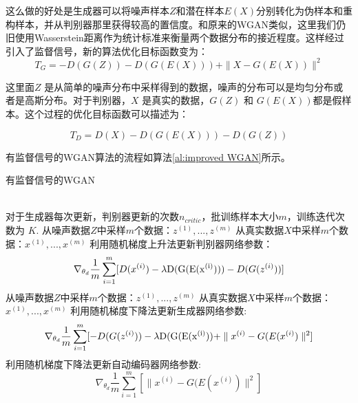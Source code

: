 这么做的好处是生成器可以将噪声样本$Z$和潜在样本$E(X)$分别转化为伪样本和重构样本，并从判别器那里获得较高的置信度。和原来的WGAN类似，这里我们仍旧使用Wasserstein距离作为统计标准来衡量两个数据分布的接近程度。这样经过引入了监督信号，新的算法优化目标函数变为：
\begin{equation}
\label{eq:12}
T_{G} = -D(G(Z))-D(G(E(X)))+\parallel X-G(E(X))\parallel^{2}
\end{equation}

这里面$Z$ 是从简单的噪声分布中采样得到的数据，噪声的分布可以是均匀分布或者是高斯分布。对于判别器，$X$ 是真实的数据，$G(Z)$ 和 $G(E(X))$都是假样本。这个过程的优化目标函数可以描述为：

\begin{equation}
\label{eq12}
T_{D} = D(X)-D(G(E(X)))-D(G(Z))
\end{equation}

有监督信号的WGAN算法的流程如算法\ref{al:improved WGAN}所示。

\begin{algorithm}[htpb]
	\caption{有监督信号的WGAN}%
	\label{al:improved WGAN}
	\begin{algorithmic}[1]%
		\Require ~~ \\
		对于生成器每次更新，判别器更新的次数$n_{critic}$，批训练样本大小$m$，训练迭代次数为 $K$.
		\State 从噪声数据$Z$中采样$m$个数据：${z^{(1)},...,z^{(m)}}$
		\State 从真实数据$X$中采样$m$个数据：${x^{(1)},...,x^{(m)}}$ 
		\State 利用随机梯度上升法更新判别器网络参数：
		\begin{equation*}
		\nabla_{\theta_{d}}\frac{1}{m}\sum_{i=1}^m[D(x^{(i)})-\lambda {\rm{D(G(E(x^{(i)})))}}-D(G(z^{(i)}))]  
		\end{equation*}
		\EndFor
		\State 从噪声数据$Z$中采样$m$个数据：${z^{(1)},...,z^{(m)}}$
		\State 从真实数据$X$中采样$m$个数据：${x^{(1)},...,x^{(m)}}$
		\State 利用随机梯度下降法更新生成器网络参数:
		\begin{equation*}
		\nabla_{\theta_{d}}\frac{1}{m}\sum_{i=1}^m[-D(G(z^{(i)}))-\lambda {\rm{D(G(E(x^{(i)}))}}+\parallel x^{(i)}-G(E(x^{(i)})\parallel^{2}]
		\end{equation*}
		\State 利用随机梯度下降法更新自动编码器网络参数:
		\begin{equation*}
		\nabla_{\theta_{d}}\frac{1}{m}\sum_{i=1}^m[\parallel x^{(i)}-G(E(x^{(i)})\parallel^{2}]
		\end{equation*}
		\EndFor
	\end{algorithmic}
\end{algorithm}
